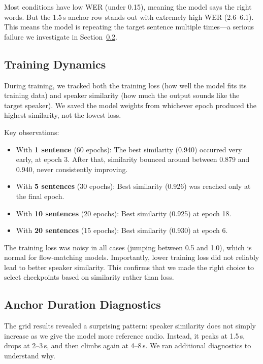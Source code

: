 \documentclass[11pt, a4paper]{article}
\begin{document}
Most conditions have low WER (under 0.15), meaning the model says the right words. But the 1.5\,s anchor row stands out with extremely high WER (2.6--6.1). This means the model is repeating the target sentence multiple times---a serious failure we investigate in Section~\ref{sec:anchor_diag}.

\subsection{Training Dynamics}

During training, we tracked both the training loss (how well the model fits its training data) and speaker similarity (how much the output sounds like the target speaker). We saved the model weights from whichever epoch produced the highest similarity, not the lowest loss.

Key observations:
\begin{itemize}[itemsep=2pt]
    \item With \textbf{1 sentence} (60 epochs): The best similarity (0.940) occurred very early, at epoch 3. After that, similarity bounced around between 0.879 and 0.940, never consistently improving.
    \item With \textbf{5 sentences} (30 epochs): Best similarity (0.926) was reached only at the final epoch.
    \item With \textbf{10 sentences} (20 epochs): Best similarity (0.925) at epoch 18.
    \item With \textbf{20 sentences} (15 epochs): Best similarity (0.930) at epoch 6.
\end{itemize}

The training loss was noisy in all cases (jumping between 0.5 and 1.0), which is normal for flow-matching models. Importantly, lower training loss did not reliably lead to better speaker similarity. This confirms that we made the right choice to select checkpoints based on similarity rather than loss.

\subsection{Anchor Duration Diagnostics}
\label{sec:anchor_diag}

The grid results revealed a surprising pattern: speaker similarity does not simply increase as we give the model more reference audio. Instead, it peaks at 1.5\,s, drops at 2--3\,s, and then climbs again at 4--8\,s. We ran additional diagnostics to understand why.
\end{document}

